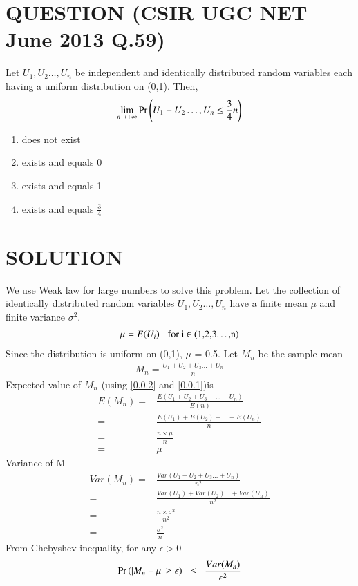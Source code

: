 \documentclass[journal,12pt,twocolumn]{IEEEtran}
\begin{document}
\section*{QUESTION (CSIR UGC NET June 2013 Q.59)}
Let $U_1,U_2\dots,U_n$ be independent and identically distributed random variables each
having a uniform distribution on (0,1). Then,$$\lim_{n \to +\infty} \Pr\left(U_1+U_2\dots,U_n\leq \frac{3}{4}n\right)$$
\begin{enumerate}
    \item does not exist
    \item exists and equals 0
    \item exists and equals 1
    \item exists and equals $\frac{3}{4}$
\end{enumerate}
\section*{SOLUTION}
We use Weak law for large numbers to solve this problem. 
Let the collection of identically distributed random variables $U_1,U_2\dots,U_n$
have a finite mean $\mu$ and finite variance $\sigma^2$.
\begin{align}
    \mu = E(U_i) \hspace{0.3cm}\text{for i $\in$ (1,2,3\dots,n)}\label{0.0.1}
\end{align}
Since the distribution is uniform on (0,1), $\mu$ = 0.5. Let $M_n$ be the sample mean
\begin{align}
     M_n = \frac{U_1+U_2+U_3\dots+U_n}{n}\label{0.0.2}
\end{align}
Expected value of $M_n$ (using \eqref{0.0.2} and \eqref{0.0.1})is
\begin{align}
    E(M_n) = &\frac{E(U_1+U_2+U_3+\dots+U_n)}{E(n)}\\[0.3cm]
     = &\frac{E(U_1)+E(U_2)+\dots+E(U_n)}{n}\\
     = &\frac{n\times\mu}{n}\\
     = & \mu
\end{align}
Variance of M
\begin{align}
    Var(M_n) =& \frac{Var(U_1+U_2+U_3\dots+U_n)}{n^2}\\[0.3cm]
    =& \frac{Var(U_1) + Var(U_2)\dots+Var(U_n)}{n^2}\\
    =& \frac{n\times{\sigma^2}}{n^2}\\[0.3cm]
    =& \frac{\sigma^2}{n} \label{0.0.10}
\end{align}
From Chebyshev inequality, for any $\epsilon > 0$
\begin{align}
    \Pr\left(|M_n-\mu|\geq \epsilon\right) \hspace{0.2cm} \leq \hspace{0.2cm} \frac{Var(M_n)}{\epsilon^2}
\end{align}
\end{document}
